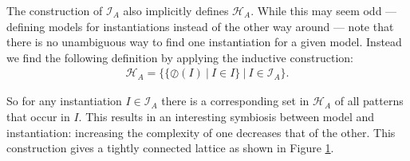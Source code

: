 \documentclass{llncs}
\begin{document}
The construction of $\mathcal{I}_A$ also implicitly defines $\mathcal{H}_A$. While this may seem odd --- defining models for instantiations instead of the other way around --- note that there is no unambiguous way to find one instantiation for a given model. Instead we find the following definition by applying the inductive construction:
%
\begin{align}
\mathcal{H}_A=\big\{\{\oslash({I}) \ | \ {I} \in {I} \} \ \big | \ {I} \in \mathcal{I}_A \big\}.
\end{align}

\noindent So for any instantiation ${I}\in \mathcal{I}_A$ there is a corresponding set in $\mathcal{H}_A$ of all patterns that occur in ${I}$. This results in an interesting symbiosis between model and instantiation: increasing the complexity of one decreases that of the other. This construction gives a tightly connected lattice as shown in Figure \ref{lattice}. 

\begin{figure}[t]

\label{lattice}
\end{figure}


\end{document}

